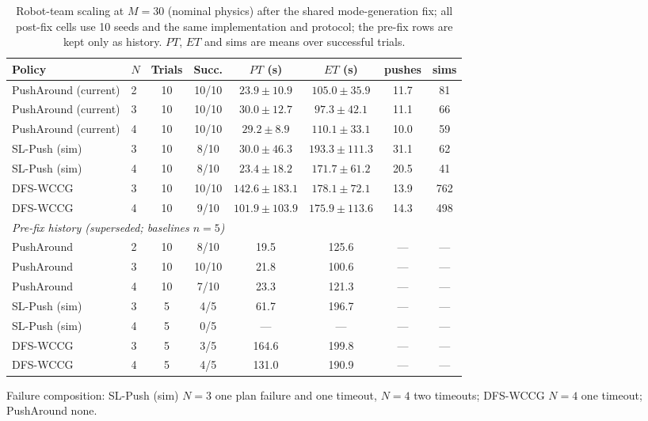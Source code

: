 \documentclass[11pt]{article}
\begin{document}
\begin{table}[H]
\centering
\begin{threeparttable}
\footnotesize
\caption{Robot-team scaling at $M{=}30$ (nominal physics) after the shared
mode-generation fix; all post-fix cells use 10 seeds and the same implementation
and protocol; the pre-fix rows are kept only as history. $PT$, $ET$ and sims are means over successful trials.}
\label{tab:robot-full}
\setlength{\tabcolsep}{4pt}
\begin{tabular}{llcccccc}
\toprule
Policy & $N$ & Trials & Succ. & $PT$ (s) & $ET$ (s) & pushes & sims\\
\midrule
PushAround (current) & 2 & 10 & 10/10 & $23.9\pm10.9$ & $105.0\pm35.9$ & 11.7 & 81\\
PushAround (current) & 3 & 10 & 10/10 & $30.0\pm12.7$ & $97.3\pm42.1$  & 11.1 & 66\\
PushAround (current) & 4 & 10 & 10/10 & $29.2\pm8.9$  & $110.1\pm33.1$ & 10.0 & 59\\
SL-Push (sim) & 3 & 10 & 8/10 & $30.0\pm46.3$ & $193.3\pm111.3$ & 31.1 & 62\\
SL-Push (sim) & 4 & 10 & 8/10 & $23.4\pm18.2$ & $171.7\pm61.2$  & 20.5 & 41\\
DFS-WCCG & 3 & 10 & 10/10 & $142.6\pm183.1$ & $178.1\pm72.1$ & 13.9 & 762\\
DFS-WCCG & 4 & 10 & 9/10 & $101.9\pm103.9$ & $175.9\pm113.6$ & 14.3 & 498\\
\midrule
\multicolumn{8}{l}{\emph{Pre-fix history (superseded; baselines $n{=}5$)}}\\
PushAround & 2 & 10 & 8/10  & 19.5 & 125.6 & --- & ---\\
PushAround & 3 & 10 & 10/10 & 21.8 & 100.6 & --- & ---\\
PushAround & 4 & 10 & 7/10  & 23.3 & 121.3 & --- & ---\\
SL-Push (sim) & 3 & 5 & 4/5 & 61.7 & 196.7 & --- & ---\\
SL-Push (sim) & 4 & 5 & 0/5 & --- & --- & --- & ---\\
DFS-WCCG & 3 & 5 & 3/5 & 164.6 & 199.8 & --- & ---\\
DFS-WCCG & 4 & 5 & 4/5 & 131.0 & 190.9 & --- & ---\\
\bottomrule
\end{tabular}
\begin{tablenotes}[flushleft]\footnotesize
\item Failure composition: SL-Push (sim) $N{=}3$ one plan failure and one
timeout, $N{=}4$ two timeouts; DFS-WCCG $N{=}4$ one timeout; PushAround none.
\end{tablenotes}
\end{threeparttable}
\vspace{-4mm}
\end{table}
\end{document}
